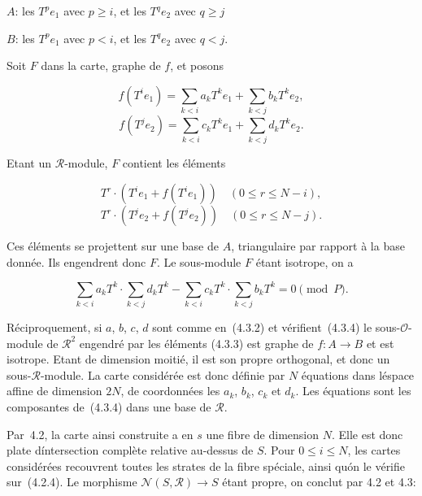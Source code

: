 \documentclass[11pt,a4paper]{article}
\theoremstyle{plain}
\theoremstyle{definition}
\begin{document}
$A$: les $T^p e_1$ avec $p \geq i$, et les $T^q e_2$ avec $q \geq j$

$B$: les $T^p e_1$ avec $p < i$, et les $T^q e_2$ avec $q < j$.

Soit $F$ dans la carte, graphe de $f$, et posons

\begin{equation}
f(T^i e_1) = \sum_{k < i} a_k T^k e_1 + \sum_{k < j} b_k T^k e_2,
\end{equation}
\begin{equation}
f(T^j e_2) = \sum_{k < i} c_k T^k e_1 + \sum_{k < j} d_k T^k e_2.
\end{equation}

Etant un $\mathscr{R}$-module, $F$ contient les \'el\'ements

\begin{equation}
T^r \cdot (T^i e_1 + f(T^i e_1)) \quad (0 \leq r \leq N - i),
\end{equation}
\begin{equation}
T^r \cdot (T^j e_2 + f(T^j e_2)) \quad (0 \leq r \leq N - j).
\end{equation}

Ces \'el\'ements se projettent sur une base de $A$, triangulaire par rapport \`a la base
donn\'ee. Ils engendrent donc $F$. Le sous-module $F$ \'etant isotrope, on a

\begin{equation}
\sum_{k < i} a_k T^k \cdot \sum_{k < j} d_k T^k - \sum_{k < i} c_k T^k \cdot \sum_{k < j} b_k T^k = 0 \pmod{P}.
\end{equation}

R\'eciproquement, si $a$, $b$, $c$, $d$ sont comme en~(4.3.2) et v\'erifient~(4.3.4) le
sous-$\mathscr{O}$-module de $\mathscr{R}^2$ engendr\'e par les \'el\'ements (4.3.3) est graphe de $f: A \to B$
et est isotrope. Etant de dimension moiti\'e, il est son propre orthogonal, et donc
un sous-$\mathscr{R}$-module. La carte consid\'er\'ee est donc d\'efinie par $N$ \'equations dans
l\'espace affine de dimension $2N$, de coordonn\'ees les $a_k$, $b_k$, $c_k$ et $d_k$. Les
\'equations sont les composantes de~(4.3.4) dans une base de $\mathscr{R}$.

Par~4.2, la carte ainsi construite a en $s$ une fibre de dimension $N$. Elle est
donc plate d\'intersection compl\`ete relative au-dessus de $S$. Pour $0 \leq i \leq N$, les
cartes consid\'er\'ees recouvrent toutes les strates de la fibre sp\'eciale, ainsi qu\'on
le v\'erifie sur~(4.2.4). Le morphisme $\mathscr{N}(S, \mathscr{R}) \to S$ \'etant propre, on conclut par
4.2 et 4.3:
\end{document}
